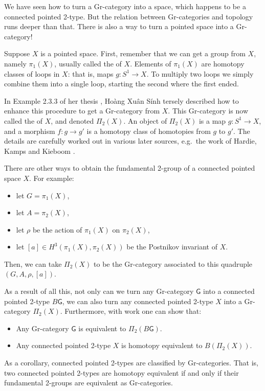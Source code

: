 \documentclass[reqno,12pt]{amsart}
\newcommand{\maps}{\colon}    %
\newcommand{\G}{{\mathsf{G}}}   %
\newcommand{\define}[1]{\textbf{\boldmath{#1}}}
\theoremstyle{definition}
\begin{document}
We have seen how to turn a Gr-category into a space, which happens to be a connected pointed 2-type.  But the relation between Gr-categories and topology runs deeper than that.  There is also a way to turn a pointed space into a Gr-category!  

Suppose $X$ is a pointed space.  First, remember that we can get a group from $X$, namely $\pi_1(X)$, usually called the \define{fundamental group} of $X$.   Elements of $\pi_1(X)$ are homotopy classes of loops in $X$: that is, maps $g \maps S^1 \to X$.   To multiply two loops we simply combine them into a single loop, starting the second where the first ended.    

In Example 2.3.3 of her thesis \cite{H73}, Ho\`ang Xu\^an S\'inh tersely described how to enhance this procedure to get a Gr-category from $X$.  This Gr-category is now called the \define{fundamental 2-group} of $X$, and denoted $\Pi_2(X)$.   An object of $\Pi_2(X)$ is a map $g \maps S^1 \to X$, and a morphism $f \maps g \to g'$ is a homotopy class of homotopies from $g$ to $g'$.  The details are carefully worked out in various later sources, e.g.\ the work of Hardie, Kamps and Kieboom \cite{HKK00,HKK01}. 

There are other ways to obtain the fundamental 2-group of a connected pointed space $X$.  For example:
\begin{itemize}
\item let $G = \pi_1(X)$,
\item let $A = \pi_2(X)$,
\item let $\rho$ be the action of $\pi_1(X)$ on $\pi_2(X)$,
\item let $[a] \in H^3(\pi_1(X),\pi_2(X))$ be the Postnikov invariant of $X$.
\end{itemize}
Then, we can take $\Pi_2(X)$ to be the Gr-category associated to this quadruple $(G,A,\rho, [a])$.  

As a result of all this, not only can we turn any Gr-category $\G$ into a 
connected pointed 2-type $B\G$, we can also turn any connected pointed 2-type $X$ into a Gr-category $\Pi_2(X)$.   Furthermore, with work 
one can show that:
\begin{itemize}
\item Any Gr-category $\G$ is equivalent to $\Pi_2(B\G)$.
\item Any connected pointed 2-type $X$ is homotopy equivalent to 
$B(\Pi_2(X))$.
\end{itemize}
As a corollary, connected pointed 2-types are classified by Gr-categories.  That is, two connected pointed 2-types are homotopy equivalent if and only if their fundamental 2-groups are equivalent as Gr-categories.
\end{document}
